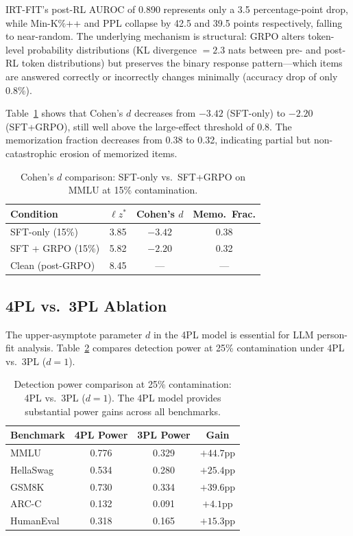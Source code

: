 \documentclass[11pt,a4paper]{article}
\begin{document}
IRT-FIT's post-RL AUROC of 0.890 represents only a 3.5 percentage-point drop, while Min-K\%++ and PPL collapse by 42.5 and 39.5 points respectively, falling to near-random.
The underlying mechanism is structural: GRPO alters token-level probability distributions (KL divergence $= 2.3$ nats between pre- and post-RL token distributions) but preserves the binary response pattern---which items are answered correctly or incorrectly changes minimally (accuracy drop of only 0.8\%).

Table~\ref{tab:post-rl-cohens-d} shows that Cohen's $d$ decreases from $-3.42$ (SFT-only) to $-2.20$ (SFT+GRPO), still well above the large-effect threshold of 0.8.
The memorization fraction decreases from 0.38 to 0.32, indicating partial but non-catastrophic erosion of memorized items.

\begin{table}[h]
\centering
\caption{Cohen's $d$ comparison: SFT-only vs.\ SFT+GRPO on MMLU at 15\% contamination.}
\label{tab:post-rl-cohens-d}
\begin{tabular}{lccc}
\toprule
\textbf{Condition} & \textbf{$\ell z^*$} & \textbf{Cohen's $d$} & \textbf{Memo.\ Frac.} \\
\midrule
SFT-only (15\%)    & 3.85  & $-3.42$ & 0.38 \\
SFT + GRPO (15\%)  & 5.82  & $-2.20$ & 0.32 \\
Clean (post-GRPO)  & 8.45  & ---     & --- \\
\bottomrule
\end{tabular}
\end{table}

\subsection{4PL vs.\ 3PL Ablation}
\label{sec:4pl-ablation}

The upper-asymptote parameter $d$ in the 4PL model is essential for LLM person-fit analysis.
Table~\ref{tab:4pl-ablation} compares detection power at 25\% contamination under 4PL vs.\ 3PL ($d = 1$).

\begin{table}[h]
\centering
\caption{Detection power comparison at 25\% contamination: 4PL vs.\ 3PL ($d=1$). The 4PL model provides substantial power gains across all benchmarks.}
\label{tab:4pl-ablation}
\begin{tabular}{lccc}
\toprule
\textbf{Benchmark} & \textbf{4PL Power} & \textbf{3PL Power} & \textbf{Gain} \\
\midrule
MMLU      & 0.776 & 0.329 & $+44.7$pp \\
HellaSwag & 0.534 & 0.280 & $+25.4$pp \\
GSM8K     & 0.730 & 0.334 & $+39.6$pp \\
ARC-C     & 0.132 & 0.091 & $+4.1$pp \\
HumanEval & 0.318 & 0.165 & $+15.3$pp \\
\bottomrule
\end{tabular}
\end{table}
\end{document}
